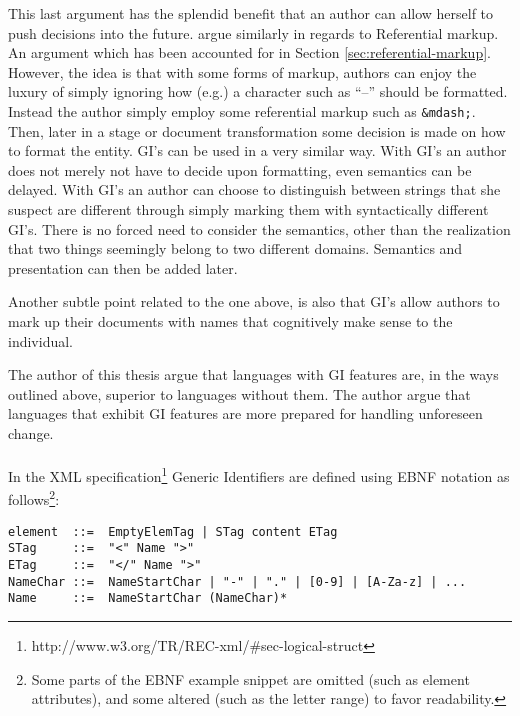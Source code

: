 \documentclass{scrreprt}
\begin{document}
This last argument has the splendid benefit that an author can allow herself to push decisions into the future. \citet{coombs} argue similarly in regards to Referential markup. An argument which has been accounted for in Section \ref{sec:referential-markup}. However, the idea is that with some forms of markup, authors can enjoy the luxury of simply ignoring how (e.g.) a character such as ``--'' should be formatted. Instead the author simply employ some referential markup such as \texttt{\&mdash;}. Then, later in a stage or document transformation some decision is made on how to format the entity. GI's can be used in a very similar way. With GI's an author does not merely not have to decide upon formatting, even semantics can be delayed. With GI's an author can choose to distinguish between strings that she suspect are different through simply marking them with syntactically different GI's. There is no forced need to consider the semantics, other than the realization that two things seemingly belong to two different domains. Semantics and presentation can then be added later.

Another subtle point related to the one above, is also that GI's allow authors to mark up their documents with names that cognitively make sense to the individual.

The author of this thesis argue that languages with GI features are, in the ways outlined above, superior to languages without them. The author argue that languages that exhibit GI features are more prepared for handling unforeseen change.



\paragraph{}In the XML specification\footnote{http://www.w3.org/TR/REC-xml/\#sec-logical-struct} Generic Identifiers are defined using EBNF notation as follows\footnote{Some parts of the EBNF example snippet are omitted (such as element attributes), and some altered (such as the letter range) to favor readability.}:

\begin{lstlisting}
element  ::=  EmptyElemTag | STag content ETag
STag     ::=  "<" Name ">"
ETag     ::=  "</" Name ">"
NameChar ::=  NameStartChar | "-" | "." | [0-9] | [A-Za-z] | ...
Name     ::=  NameStartChar (NameChar)*
\end{lstlisting}
\end{document}
